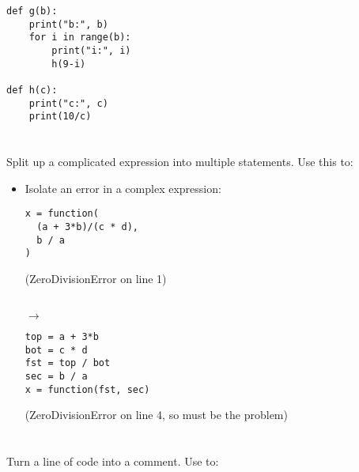 \documentclass{handout}
\begin{document}
\begin{multicols}{2}
\begin{itemize}
\begin{minipage}[t]{0.42\columnwidth}
\begin{lstlisting}
def g(b):
    print("b:", b)
    for i in range(b):
        print("i:", i)
        h(9-i)

def h(c):
    print("c:", c)
    print(10/c)
\end{lstlisting}
\end{minipage}


\end{itemize}

\columnbreak

\section{}

Split up a complicated expression into multiple statements. Use this to:

\begin{itemize}

\item Isolate an error in a complex expression: \\
\noindent
\begin{minipage}[t]{0.42\columnwidth}
\begin{lstlisting}
x = function(
  (a + 3*b)/(c * d),
  b / a
)
\end{lstlisting}
(ZeroDivisionError on line 1)
\end{minipage}
\begin{minipage}[t]{0.05\columnwidth}
\  \\
\hspace*{1ex}$\rightarrow$
\end{minipage}
\begin{minipage}[t]{0.42\columnwidth}
\begin{lstlisting}
top = a + 3*b
bot = c * d
fst = top / bot
sec = b / a
x = function(fst, sec)
\end{lstlisting}
(ZeroDivisionError on line 4, so  must be the problem)
\end{minipage}

\end{itemize}


\section{}

Turn a line of code into a comment. Use to:

\begin{itemize}


\end{itemize}
\end{multicols}
\end{document}
